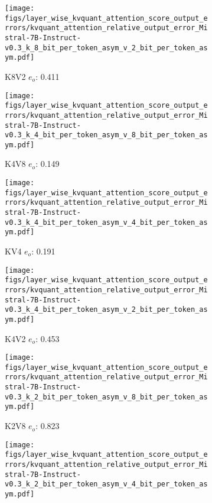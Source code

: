 \begin{figure}
    \begin{subfigure}{0.25\columnwidth}
    \texttt{[image: figs/layer\_wise\_kvquant\_attention\_score\_output\_errors/kvquant\_attention\_relative\_output\_error\_Mistral-7B-Instruct-v0.3\_k\_8\_bit\_per\_token\_asym\_v\_2\_bit\_per\_token\_asym.pdf]}
    \caption{K8V2 $e_o$: 0.411}
    \label{fig:kvcache_simulated_quant_error_layer_wise_k8v2_per_token_asym_Mistral-7B-Instruct-v0.3}
    \end{subfigure}
    \begin{subfigure}{0.25\columnwidth}
    \texttt{[image: figs/layer\_wise\_kvquant\_attention\_score\_output\_errors/kvquant\_attention\_relative\_output\_error\_Mistral-7B-Instruct-v0.3\_k\_4\_bit\_per\_token\_asym\_v\_8\_bit\_per\_token\_asym.pdf]}
    \caption{K4V8 $e_o$: 0.149}
    \label{fig:kvcache_simulated_quant_error_layer_wise_k4v8_per_token_asym_Mistral-7B-Instruct-v0.3}
    \end{subfigure}
    \begin{subfigure}{0.25\columnwidth}
    \texttt{[image: figs/layer\_wise\_kvquant\_attention\_score\_output\_errors/kvquant\_attention\_relative\_output\_error\_Mistral-7B-Instruct-v0.3\_k\_4\_bit\_per\_token\_asym\_v\_4\_bit\_per\_token\_asym.pdf]}
    \caption{KV4 $e_o$: 0.191 }
    \label{fig:kvcache_simulated_quant_error_layer_wise_k4v4_per_token_asym_Mistral-7B-Instruct-v0.3}
    \end{subfigure}
    \begin{subfigure}{0.25\columnwidth}
    \texttt{[image: figs/layer\_wise\_kvquant\_attention\_score\_output\_errors/kvquant\_attention\_relative\_output\_error\_Mistral-7B-Instruct-v0.3\_k\_4\_bit\_per\_token\_asym\_v\_2\_bit\_per\_token\_asym.pdf]}
    \caption{K4V2 $e_o$: 0.453}
    \label{fig:kvcache_simulated_quant_error_layer_wise_k4v2_per_token_asym_Mistral-7B-Instruct-v0.3}
    \end{subfigure}
    \begin{subfigure}{0.25\columnwidth}
    \texttt{[image: figs/layer\_wise\_kvquant\_attention\_score\_output\_errors/kvquant\_attention\_relative\_output\_error\_Mistral-7B-Instruct-v0.3\_k\_2\_bit\_per\_token\_asym\_v\_8\_bit\_per\_token\_asym.pdf]}
    \caption{K2V8 $e_o$: 0.823}
    \label{fig:kvcache_simulated_quant_error_layer_wise_k2v8_per_token_asym_Mistral-7B-Instruct-v0.3}
    \end{subfigure}
    \begin{subfigure}{0.25\columnwidth}
    \texttt{[image: figs/layer\_wise\_kvquant\_attention\_score\_output\_errors/kvquant\_attention\_relative\_output\_error\_Mistral-7B-Instruct-v0.3\_k\_2\_bit\_per\_token\_asym\_v\_4\_bit\_per\_token\_asym.pdf]}

\end{subfigure}
\end{figure}
